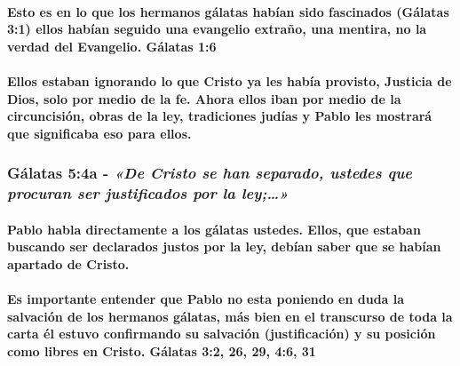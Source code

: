 \documentclass[11a pt,twoside]{article}
\newcommand{\scripture}[1]{%
  {\fontsize{12pt}{16pt}\selectfont\ScriptureFont\itshape #1}%
}
\let\oldsubsubsection\subsubsection
\renewcommand{\subsubsection}{\needspace{4\baselineskip}\oldsubsubsection}
\let\oldparagraph\paragraph
\renewcommand{\paragraph}{\needspace{3\baselineskip}\oldparagraph}
\begin{document}
\paragraph{Esto es en lo que los hermanos gálatas habían sido fascinados
(Gálatas 3:1) ellos habían seguido una evangelio extraño, una mentira,
no la verdad del Evangelio. Gálatas
1:6}\label{esto-es-en-lo-que-los-hermanos-guxe1latas-habuxedan-sido-fascinados-guxe1latas-31-ellos-habuxedan-seguido-una-evangelio-extrauxf1o-una-mentira-no-la-verdad-del-evangelio.-guxe1latas-16}

\paragraph{Ellos estaban ignorando lo que Cristo ya les había provisto,
Justicia de Dios, solo por medio de la fe. Ahora ellos iban por medio de
la circuncisión, obras de la ley, tradiciones judías y Pablo les
mostrará que significaba eso para
ellos.}\label{ellos-estaban-ignorando-lo-que-cristo-ya-les-habuxeda-provisto-justicia-de-dios-solo-por-medio-de-la-fe.-ahora-ellos-iban-por-medio-de-la-circuncisiuxf3n-obras-de-la-ley-tradiciones-juduxedas-y-pablo-les-mostraruxe1-que-significaba-eso-para-ellos.}

\subsubsection{\texorpdfstring{Gálatas 5:4a -
\scripture{«De Cristo se han separado, ustedes que procuran ser justificados por la ley;…»}}{Gálatas 5:4a - }}\label{guxe1latas-54a---de-cristo-se-han-separado-ustedes-que-procuran-ser-justificados-por-la-ley}

\paragraph{Pablo habla directamente a los gálatas ustedes. Ellos, que
estaban buscando ser declarados justos por la ley, debían saber que se
habían apartado de
Cristo.}\label{pablo-habla-directamente-a-los-guxe1latas-ustedes.-ellos-que-estaban-buscando-ser-declarados-justos-por-la-ley-debuxedan-saber-que-se-habuxedan-apartado-de-cristo.}

\paragraph{Es importante entender que Pablo no esta poniendo en duda la
salvación de los hermanos gálatas, más bien en el transcurso de toda la
carta él estuvo confirmando su salvación (justificación) y su posición
como libres en Cristo. Gálatas 3:2, 26, 29, 4:6,
31}\label{es-importante-entender-que-pablo-no-esta-poniendo-en-duda-la-salvaciuxf3n-de-los-hermanos-guxe1latas-muxe1s-bien-en-el-transcurso-de-toda-la-carta-uxe9l-estuvo-confirmando-su-salvaciuxf3n-justificaciuxf3n-y-su-posiciuxf3n-como-libres-en-cristo.-guxe1latas-32-26-29-46-31}
\end{document}
